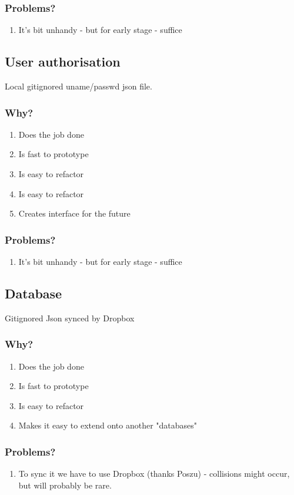 \documentclass[12pt,a4paper,twoside]{article}
\begin{document}
\subsubsection{Problems?}
\begin{enumerate}
    \item It's bit unhandy - but for early stage - suffice
\end{enumerate}

\subsection{User authorisation}\label{AUTH:POC}
Local gitignored uname/passwd json file.
\subsubsection{Why?}
\begin{enumerate}
    \item Does the job done
    \item Is fast to prototype
    \item Is easy to refactor
    \item Is easy to refactor
    \item Creates interface for the future
\end{enumerate}
\subsubsection{Problems?}
\begin{enumerate}
    \item It's bit unhandy - but for early stage - suffice
\end{enumerate}
\subsection{Database}\label{DB:POC}
Gitignored Json synced by Dropbox
\subsubsection{Why?}
\begin{enumerate}
    \item Does the job done
    \item Is fast to prototype
    \item Is easy to refactor
    \item Makes it easy to extend onto another "databases"
\end{enumerate}
\subsubsection{Problems?}
\begin{enumerate}
    \item To sync it we have to use Dropbox (thanks Poszu) - collisions might occur, but will probably be rare.
\end{enumerate}
\end{document}
